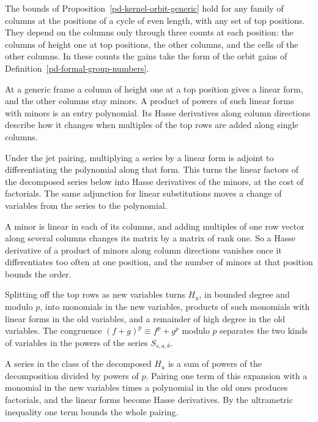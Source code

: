 The bounds of Proposition~\ref{pd-kernel-orbit-generic} hold for any family of columns at the positions of
a cycle of even length, with any set of top positions. They depend on the columns only through three
counts at each position: the columns of height one at top positions, the other columns, and the cells of
the other columns. In these counts the gains take the form of the orbit gains of
Definition~\ref{pd-formal-group-numbers}.

At a generic frame a column of height one at a top position gives a linear form, and the other columns
stay minors. A product of powers of such linear forms with minors is an entry polynomial. Its Hasse
derivatives along column directions describe how it changes when multiples of the top rows are added
along single columns.

Under the jet pairing, multiplying a series by a linear form is adjoint to differentiating the polynomial
along that form. This turns the linear factors of the decomposed series below into Hasse derivatives of
the minors, at the cost of factorials. The same adjunction for linear substitutions moves a change of
variables from the series to the polynomial.

A minor is linear in each of its columns, and adding multiples of one row vector along several columns
changes its matrix by a matrix of rank one. So a Hasse derivative of a product of minors along column
directions vanishes once it differentiates too often at one position, and the number of minors at that
position bounds the order.

Splitting off the top rows as new variables turns $H_u$, in bounded degree and modulo $p$, into monomials
in the new variables, products of such monomials with linear forms in the old variables, and a remainder
of high degree in the old variables. The congruence $(f+g)^p\equiv f^p+g^p$ modulo $p$ separates the two
kinds of variables in the powers of the series $S_{s,a,b}$.

A series in the class of the decomposed $H_u$ is a sum of powers of the decomposition divided by powers of
$p$. Pairing one term of this expansion with a monomial in the new variables times a polynomial in the old
ones produces factorials, and the linear forms become Hasse derivatives. By the ultrametric inequality
one term bounds the whole pairing.

